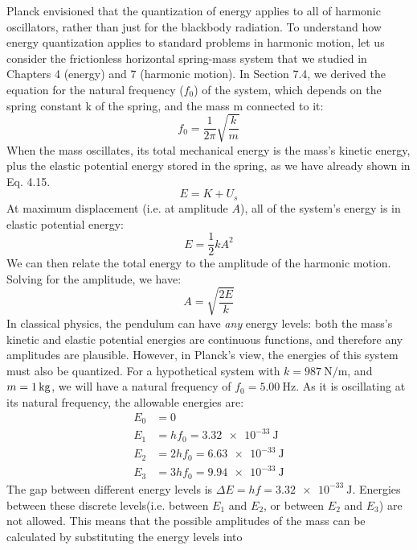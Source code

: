 Planck envisioned that the quantization of energy applies to all of harmonic
oscillators, rather than just for the blackbody radiation. To understand how
energy quantization applies to standard problems in harmonic motion, let us
consider the frictionless horizontal spring-mass system that we studied in
Chapters 4 (energy) and 7 (harmonic motion). In Section 7.4, we derived the
equation for the natural frequency ($f_0$) of the system, which depends on the
spring constant k of the spring, and the mass m connected to it:
\begin{equation*}
  f_0 = \frac1{2\pi}\sqrt{\frac km}
\end{equation*}
When the mass oscillates, its total mechanical energy is the mass's kinetic
energy, plus the elastic potential energy stored in the spring, as we have
already shown in Eq. 4.15.
\begin{equation*}
  E = K + U_s
\end{equation*}
At maximum displacement (i.e. at amplitude $A$), all of the system's energy is
in elastic potential energy:
\begin{equation*}
  E = \frac12kA^2
\end{equation*}
We can then relate the total energy to the amplitude of the harmonic motion.
Solving for the amplitude, we have:
\begin{equation}
  A=\sqrt{\frac{2E}k}
  \label{eq:amplitude-from-energy}
\end{equation}
In classical physics, the pendulum can have \emph{any} energy levels: both the
mass's kinetic and elastic potential energies are continuous functions, and
therefore any amplitudes are plausible. However, in Planck's view, the energies
of this system must also be quantized. For a hypothetical system with
$k=\SI{987}{\newton\per\metre}$, and $m=\SI1{\kilo\gram}$, we will have a
natural frequency of $f_0=\SI{5.00}\hertz$. As it is oscillating at its natural
frequency, the allowable energies are:
\begin{align*}
  E_0 &= 0\\
  E_1 &= hf_0  = \SI{3.32e-33}{\joule}\\
  E_2 &= 2hf_0 = \SI{6.63e-33}{\joule}\\
  E_3 &= 3hf_0 = \SI{9.94e-33}{\joule}
\end{align*}
The gap between different energy levels is $\Delta E=hf=\SI{3.32e-33}\joule$.
Energies between these discrete levels(i.e. between $E_1$ and $E_2$, or between
$E_2$ and $E_3$) are not allowed. This means that the possible amplitudes of
the mass can be calculated by substituting the energy levels into
